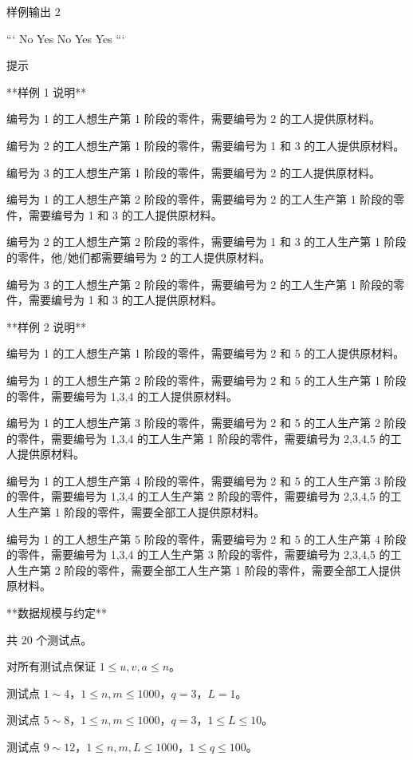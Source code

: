 \documentclass[12pt,twiside,a4paper]{ctexbook}
\numberwithin{chapter}{part}
\begin{document}
 样例输出 2

```
No
Yes
No
Yes
Yes
```

 提示

**样例 1 说明**

编号为 1 的工人想生产第 1 阶段的零件，需要编号为 2 的工人提供原材料。

编号为 2 的工人想生产第 1 阶段的零件，需要编号为 1 和 3 的工人提供原材料。

编号为 3 的工人想生产第 1 阶段的零件，需要编号为 2 的工人提供原材料。

编号为 1 的工人想生产第 2 阶段的零件，需要编号为 2 的工人生产第 1 阶段的零 件，需要编号为 1 和 3 的工人提供原材料。

编号为 2 的工人想生产第 2 阶段的零件，需要编号为 1 和 3 的工人生产第 1 阶段的零件，他/她们都需要编号为 2 的工人提供原材料。

编号为 3 的工人想生产第 2 阶段的零件，需要编号为 2 的工人生产第 1 阶段的零件，需要编号为 1 和 3 的工人提供原材料。

**样例 2 说明**

编号为 1 的工人想生产第 1 阶段的零件，需要编号为 2 和 5 的工人提供原材料。

编号为 1 的工人想生产第 2 阶段的零件，需要编号为 2 和 5 的工人生产第 1 阶段的零件，需要编号为 1,3,4 的工人提供原材料。

编号为 1 的工人想生产第 3 阶段的零件，需要编号为 2 和 5 的工人生产第 2 阶段的零件，需要编号为 1,3,4 的工人生产第 1 阶段的零件，需要编号为 2,3,4,5 的工人提供原材料。

编号为 1 的工人想生产第 4 阶段的零件，需要编号为 2 和 5 的工人生产第 3 阶段的零件，需要编号为 1,3,4 的工人生产第 2 阶段的零件，需要编号为 2,3,4,5 的工人生产第 1 阶段的零件，需要全部工人提供原材料。

编号为 1 的工人想生产第 5 阶段的零件，需要编号为 2 和 5 的工人生产第 4 阶段的零件，需要编号为 1,3,4 的工人生产第 3 阶段的零件，需要编号为 2,3,4,5 的工人生产第 2 阶段的零件，需要全部工人生产第 1 阶段的零件，需要全部工人提供原材料。

**数据规模与约定**

共 $20$ 个测试点。

对所有测试点保证 $1 \leq u, v, a \leq n$。

测试点 $1\sim4$，$1 \leq n, m \leq 1000$，$q = 3$，$L = 1$。

测试点 $5\sim8$，$1 \leq n, m \leq 1000$，$q = 3$，$1 \leq L \leq 10$。

测试点 $9\sim12$，$1 \leq n, m, L \leq 1000$，$1 \leq q \leq 100$。
\end{document}
